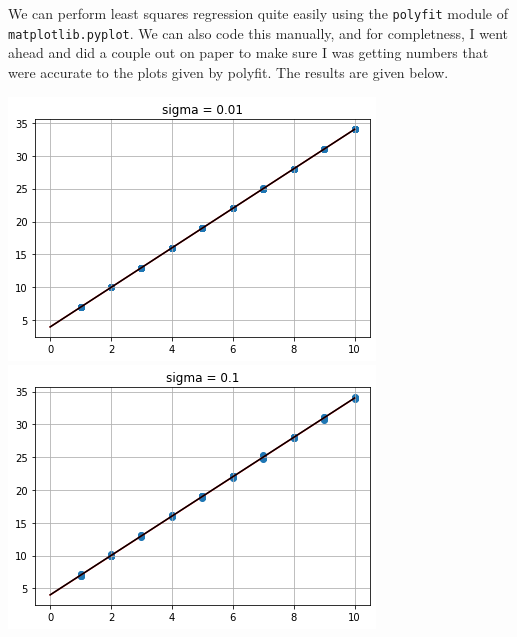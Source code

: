 \documentclass[11pt]{article}
\begin{document}
\begin{enumerate}
            We can perform least squares regression quite easily using the
            \texttt{polyfit} module of \texttt{matplotlib.pyplot}. We can also
            code this manually, and for completness, I went ahead and did a
            couple out on paper to make sure I was getting numbers that were
            accurate to the plots given by polyfit. The results are given
            below.

            \begin{minipage}[t]{0.48\linewidth}
                \begin{center}
                    \includegraphics[width=\linewidth]{sr.01.png}
                    \includegraphics[width=\linewidth]{sr.1.png}
                \end{center}
            \end{minipage}\hfill\vline\hfill%

\end{enumerate}
\end{document}
